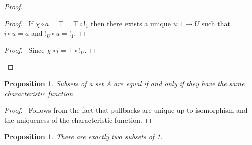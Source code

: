 \documentclass{book}
\let\qed\relax
\newtheorem{prop}[ax]{Proposition}
\theoremstyle{definition}
\begin{document}
\begin{proof}
\pf
{}
\begin{proof}
	\pf\ If $\chi \circ a = \top = \top \circ !_1$ then there exists a unique $u : 1 \rightarrow U$ such that $i \circ u = a$ and $!_U \circ u = !_1$.
\end{proof}
\begin{proof}
	\pf\ Since $\chi \circ i = \top \circ !_U$.
\end{proof}
\qed
\end{proof}

\begin{prop}
Subsets of a set $A$ are equal if and only if they have the same characteristic function.
\end{prop}

\begin{proof}
\pf\ Follows from the fact that pullbacks are unique up to isomorphism and the uniqueness of the characteristic function. \qed
\end{proof}

\begin{prop}
There are exactly two subsets of 1.
\end{prop}
\end{document}
